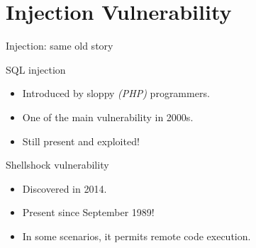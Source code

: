 \section{Injection Vulnerability}

\begin{frame}{Injection: same old story}

\begin{block}{SQL injection}
  \begin{itemize}
    \item Introduced by sloppy \emph{(PHP)} programmers.
    \item One of the main vulnerability in 2000s.
    \item Still present and exploited!
  \end{itemize}
\end{block}

\begin{block}{Shellshock vulnerability}
  \begin{itemize}
    \item Discovered in 2014.
    \item Present since September 1989!
    \item In some scenarios, it permits remote code execution.
  \end{itemize}
\end{block}
\end{frame}

